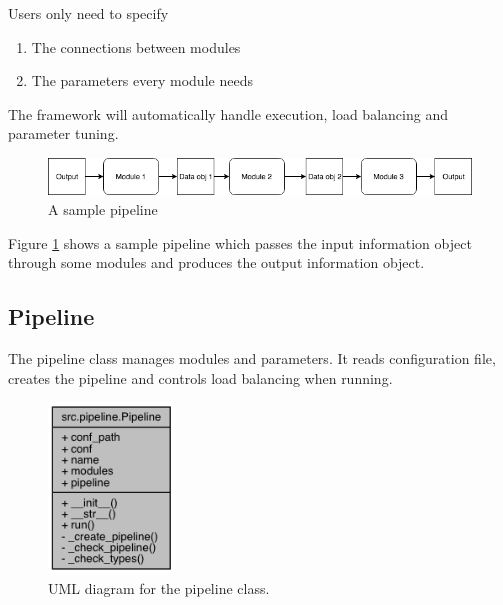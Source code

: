 \documentclass{article}
\begin{document}
    Users only need to specify
    \begin{enumerate}
        \item The connections between modules
        \item The parameters every module needs
    \end{enumerate}
    The framework will automatically handle execution, load balancing and parameter tuning.

    \begin{figure}[H]
        \begin{center}
            \includegraphics[width=1.2\textwidth]{fig/sample_pipeline.png}
        \end{center}
        \label{fig:sample_pipeline}
        \caption{A sample pipeline}
    \end{figure}
    Figure \ref{fig:sample_pipeline} shows a sample pipeline which passes the input information object
    through some modules and produces the output information object.



    \subsection{Pipeline}
    The pipeline class manages modules and parameters.
    It reads configuration file, creates the pipeline and controls load balancing when running.

    \begin{figure}[h]
        \begin{center}
            \includegraphics[width=0.3\textwidth]{fig/pipeline_uml.png}
        \end{center}
        \label{fig:pipeline_uml}
        \caption{UML diagram for the pipeline class.}
    \end{figure}
\end{document}
